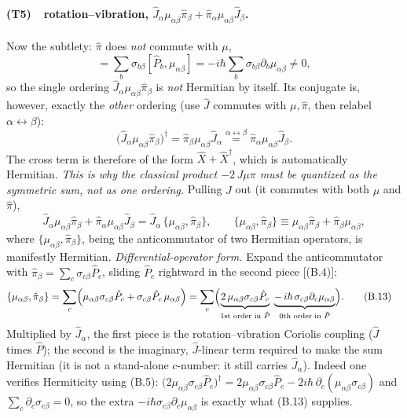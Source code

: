 \paragraph{(T5)\ \ rotation--vibration, $\hat J_\alpha\mu_{\alpha\beta}\hat\pi_\beta+\hat\pi_\alpha\mu_{\alpha\beta}\hat J_\beta$.}
Now the subtlety: $\hat\pi$ does \emph{not} commute with $\mu$,
\begin{equation*}
[\hat\pi_\beta,\mu_{\alpha\beta}]=\sum_b\sigma_{b\beta}[\hat P_b,\mu_{\alpha\beta}]=-i\hbar\sum_b\sigma_{b\beta}\partial_b\mu_{\alpha\beta}\neq0 ,
\end{equation*}
so the single ordering $\hat J_\alpha\mu_{\alpha\beta}\hat\pi_\beta$ is \emph{not} Hermitian by itself. Its conjugate is, however, exactly the \emph{other} ordering (use $\hat J$ commutes with $\mu,\hat\pi$, then relabel $\alpha\leftrightarrow\beta$):
\begin{equation*}
\bigl(\hat J_\alpha\mu_{\alpha\beta}\hat\pi_\beta\bigr)^{\dagger}
=\hat\pi_\beta\mu_{\alpha\beta}\hat J_\alpha
\overset{\alpha\leftrightarrow\beta}{=}\hat\pi_\alpha\mu_{\alpha\beta}\hat J_\beta .
\end{equation*}
The cross term is therefore of the form $\hat X+\hat X^{\dagger}$, which is automatically Hermitian. \emph{This is why the classical product $-2\,J\mu\pi$ must be quantized as the symmetric sum, not as one ordering.} Pulling $\hat J$ out (it commutes with both $\mu$ and $\hat\pi$),
\begin{equation}
\hat J_\alpha\mu_{\alpha\beta}\hat\pi_\beta+\hat\pi_\alpha\mu_{\alpha\beta}\hat J_\beta
=\hat J_\alpha\,\{\mu_{\alpha\beta},\hat\pi_\beta\},
\qquad \{\mu_{\alpha\beta},\hat\pi_\beta\}\equiv\mu_{\alpha\beta}\hat\pi_\beta+\hat\pi_\beta\mu_{\alpha\beta} , \tag{B.12}
\end{equation}
where $\{\mu_{\alpha\beta},\hat\pi_\beta\}$, being the anticommutator of two Hermitian operators, is manifestly Hermitian. \emph{Differential-operator form.} Expand the anticommutator with $\hat\pi_\beta=\sum_c\sigma_{c\beta}\hat P_c$, sliding $\hat P_c$ rightward in the second piece [(B.4)]:
\begin{align}
\{\mu_{\alpha\beta},\hat\pi_\beta\}
&=\sum_c\Bigl(\mu_{\alpha\beta}\sigma_{c\beta}\hat P_c+\sigma_{c\beta}\hat P_c\,\mu_{\alpha\beta}\Bigr)
=\sum_c\Bigl(\underbrace{2\,\mu_{\alpha\beta}\sigma_{c\beta}\hat P_c}_{\text{1st order in }\hat P}
\;\underbrace{-\,i\hbar\,\sigma_{c\beta}\partial_c\mu_{\alpha\beta}}_{\text{0th order in }\hat P}\Bigr). \tag{B.13}
\end{align}
Multiplied by $\hat J_\alpha$, the first piece is the rotation--vibration Coriolis coupling ($\hat J$ times $\hat P$); the second is the imaginary, $\hat J$-linear term required to make the sum Hermitian (it is not a stand-alone $c$-number: it still carries $\hat J_\alpha$). Indeed one verifies Hermiticity using (B.5): $\bigl(2\mu_{\alpha\beta}\sigma_{c\beta}\hat P_c\bigr)^{\dagger}=2\mu_{\alpha\beta}\sigma_{c\beta}\hat P_c-2i\hbar\,\partial_c(\mu_{\alpha\beta}\sigma_{c\beta})$ and $\sum_c\partial_c\sigma_{c\beta}=0$, so the extra $-i\hbar\sigma_{c\beta}\partial_c\mu_{\alpha\beta}$ is exactly what (B.13) supplies.

